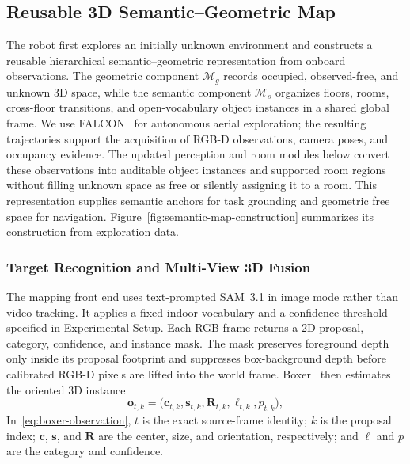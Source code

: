 \documentclass[letterpaper,10pt,journal]{IEEEtran}
\begin{document}
\subsection{Reusable 3D Semantic--Geometric Map}
\label{sec:semantic-representation}

The robot first explores an initially unknown environment and constructs a reusable hierarchical semantic--geometric representation from onboard observations. The geometric component $\mathcal M_g$ records occupied, observed-free, and unknown 3D space, while the semantic component $\mathcal M_s$ organizes floors, rooms, cross-floor transitions, and open-vocabulary object instances in a shared global frame. We use FALCON~\cite{zhang2024falcon} for autonomous aerial exploration; the resulting trajectories support the acquisition of RGB-D observations, camera poses, and occupancy evidence. The updated perception and room modules below convert these observations into auditable object instances and supported room regions without filling unknown space as free or silently assigning it to a room. This representation supplies semantic anchors for task grounding and geometric free space for navigation. Figure~\ref{fig:semantic-map-construction} summarizes its construction from exploration data.

\subsubsection{Target Recognition and Multi-View 3D Fusion}

The mapping front end uses text-prompted SAM~3.1 in image mode rather than video tracking. It applies a fixed indoor vocabulary and a confidence threshold specified in Experimental Setup. Each RGB frame returns a 2D proposal, category, confidence, and instance mask. The mask preserves foreground depth only inside its proposal footprint and suppresses box-background depth before calibrated RGB-D pixels are lifted into the world frame. Boxer~\cite{detone2026boxer} then estimates the oriented 3D instance
\begin{equation}
\mathbf{o}_{t,k}
=\bigl(\mathbf{c}_{t,k},\mathbf{s}_{t,k},\mathbf{R}_{t,k},
\ell_{t,k},p_{t,k}\bigr),
\label{eq:boxer-observation}
\end{equation}
In~\eqref{eq:boxer-observation}, $t$ is the exact source-frame identity; $k$ is the proposal index; $\mathbf{c}$, $\mathbf{s}$, and $\mathbf{R}$ are the center, size, and orientation, respectively; and $\ell$ and $p$ are the category and confidence.
\end{document}
